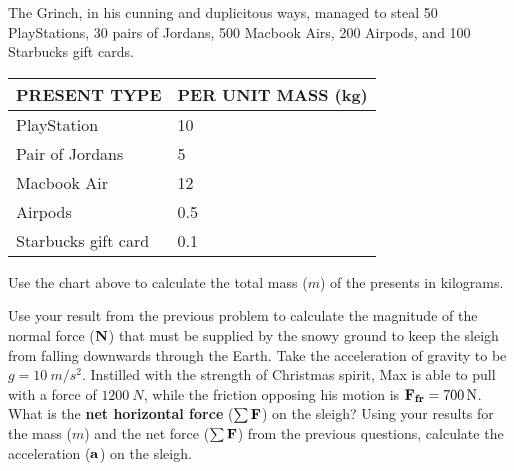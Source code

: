 \documentclass[11pt,addpoints,letterpaper]{exam}
\newcommand{\qsp}{\vspace{5cm}}
\begin{document}
\begin{questions}
\question[2] The Grinch, in his cunning and duplicitous ways, managed to steal 50 PlayStations, 30 pairs of Jordans, 500 Macbook Airs, 200 Airpods, and 100 Starbucks gift cards. 
\begin{center}
{\ttfamily
\begin{tabular}{| p{7cm} | p{5cm} |}
\hline
\uppercase{Present Type} & \uppercase{Per Unit Mass} (kg) \\ 
\hline
PlayStation & 10 \\ 
\hline
Pair of Jordans & 5 \\ 
\hline
Macbook Air & 12 \\ 
\hline
Airpods & 0.5 \\ 
\hline
Starbucks gift card & 0.1 \\ 
\hline
\end{tabular}}
\end{center}
Use the chart above to calculate the total mass ($m$) of the presents in kilograms.
\qsp
\pagebreak

\question[2] Use your result from the previous problem to calculate the magnitude of the normal force ($\vb{N}$) that must be supplied by the snowy ground to keep the sleigh from falling downwards through the Earth. Take the acceleration of gravity to be $g=\SI{10}{m/s^2}$.
\qsp
\question[2] Instilled with the strength of Christmas spirit, Max is able to pull with a force of $\SI{1200}{N}$, while the friction opposing his motion is $\vb{F_{fr}}=\SI{700}{N}$. What is the \textbf{net horizontal force} ($\sum \vb{F}$) on the sleigh?
\qsp
\question[2] Using your results for the mass ($m$) and the net force ($\sum \vb{F}$) from the previous questions, calculate the acceleration ($\vb{a}$) on the sleigh. 
\qsp
\end{questions}
\end{document}
